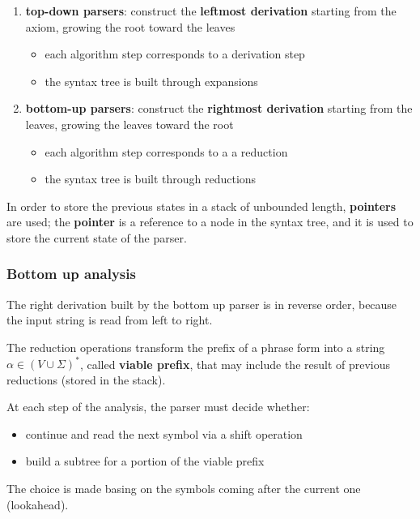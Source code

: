 \documentclass[english]{article}
\begin{document}
\begin{enumerate}
  \item \textbf{top-down parsers}: construct the \textbf{leftmost derivation} starting from the axiom, growing the root toward the leaves
        \begin{itemize}
          \item each algorithm step corresponds to a derivation step
          \item the syntax tree is built through expansions
        \end{itemize}
  \item \textbf{bottom-up parsers}: construct the \textbf{rightmost derivation} starting from the leaves, growing the leaves toward the root
        \begin{itemize}
          \item each algorithm step corresponds to a a reduction
          \item the syntax tree is built through reductions
        \end{itemize}
\end{enumerate}

\bigskip
In order to store the previous states in a stack of unbounded length, \textbf{pointers} are used;
the \textbf{pointer} is a reference to a node in the syntax tree, and it is used to store the current state of the parser.

\subsubsection{Bottom up analysis}

The right derivation built by the bottom up parser is in reverse order, because the input string is read from left to right.

The reduction operations transform the prefix of a phrase form into a string \(\alpha \in \left( V \cup \Sigma \right)^\ast\), called \textbf{viable prefix}, that may include the result of previous reductions (stored in the stack).

At each step of the analysis, the parser must decide whether:

\begin{itemize}
  \item continue and read the next symbol via a shift operation
  \item build a subtree for a portion of the viable prefix
\end{itemize}

The choice is made basing on the symbols coming after the current one (lookahead).
\end{document}
